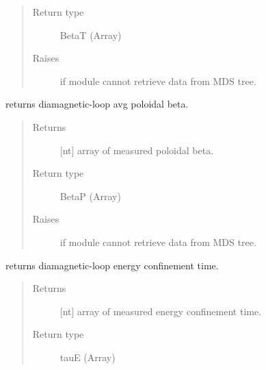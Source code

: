 \documentclass[letterpaper,10pt,english]{sphinxmanual}
\begin{document}
\begin{fulllineitems}
\begin{fulllineitems}
\begin{quote}
\begin{description}
\item[{Return type}] \leavevmode
BetaT (Array)

\item[{Raises}] \leavevmode
{} \textendash{} if module cannot retrieve data from MDS tree.

\end{description}\end{quote}

\end{fulllineitems}


\begin{fulllineitems}
\label{\detokenize{eqtools:eqtools.EFIT.EFITTree.getDiamagBetaP}}
returns diamagnetic-loop avg poloidal beta.
\begin{quote}\begin{description}
\item[{Returns}] \leavevmode
{[}nt{]} array of measured poloidal beta.

\item[{Return type}] \leavevmode
BetaP (Array)

\item[{Raises}] \leavevmode
{} \textendash{} if module cannot retrieve data from MDS tree.

\end{description}\end{quote}

\end{fulllineitems}


\begin{fulllineitems}
\label{\detokenize{eqtools:eqtools.EFIT.EFITTree.getDiamagTauE}}
returns diamagnetic-loop energy confinement time.
\begin{quote}\begin{description}
\item[{Returns}] \leavevmode
{[}nt{]} array of measured energy confinement time.

\item[{Return type}] \leavevmode
tauE (Array)


\end{description}
\end{quote}
\end{fulllineitems}
\end{fulllineitems}
\end{document}
